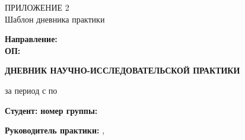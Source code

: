 \begin{center}
{\large ПРИЛОЖЕНИЕ 2}\\[0.5em]
Шаблон дневника практики
\end{center}

\vspace{1em}

\begin{center}
\textbf{\MakeUppercase{\UniversityName}}
\end{center}

\noindent\textbf{Направление:} \DirectionName\\
\textbf{ОП:} \ProgramName

\vspace{1em}

\begin{center}
{\Large\bfseries ДНЕВНИК НАУЧНО-ИССЛЕДОВАТЕЛЬСКОЙ ПРАКТИКИ}
\end{center}

\noindent за период с \PracticeStart{} по \PracticeEnd

\noindent\textbf{Студент:} \StudentName \hfill \textbf{номер группы:} \StudentGroup

\noindent\textbf{Руководитель практики:} \SupervisorName, \SupervisorRole

\vspace{1em}

